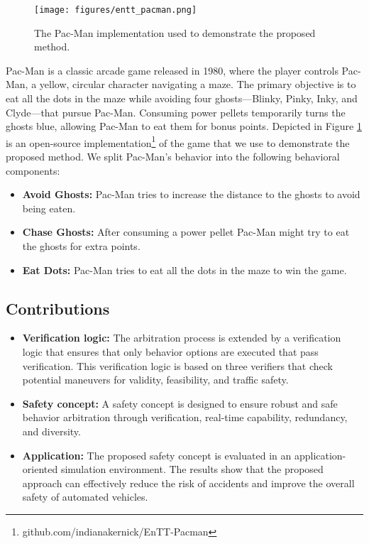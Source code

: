 \begin{figure}
    \centering
    \texttt{[image: figures/entt\_pacman.png]}
    \caption{The Pac-Man implementation used to demonstrate the proposed method.}
    \label{fig:entt-pacman}
\end{figure}
Pac-Man is a classic arcade game released in 1980, where the player controls Pac-Man, a yellow, circular character navigating a maze.
The primary objective is to eat all the dots in the maze while avoiding four ghosts—Blinky, Pinky, Inky, and Clyde—that pursue Pac-Man.
Consuming power pellets temporarily turns the ghosts blue, allowing Pac-Man to eat them for bonus points.
Depicted in Figure \ref{fig:entt-pacman} is an open-source implementation\footnote{github.com/indianakernick/EnTT-Pacman} of the game that we use to demonstrate the proposed method.
We split Pac-Man's behavior into the following behavioral components:

\begin{itemize}
    \item \textbf{Avoid Ghosts:} Pac-Man tries to increase the distance to the ghosts to avoid being eaten.
    \item \textbf{Chase Ghosts:} After consuming a power pellet Pac-Man might try to eat the ghosts for extra points.
    \item \textbf{Eat Dots:} Pac-Man tries to eat all the dots in the maze to win the game.
\end{itemize}

\subsection{Contributions}

\begin{itemize}
    \item \textbf{Verification logic:} The arbitration process is extended by a verification logic that ensures that only behavior options are executed that pass verification. This verification logic is based on three verifiers that check potential maneuvers for validity, feasibility, and traffic safety.
    \item \textbf{Safety concept:} A safety concept is designed to ensure robust and safe behavior arbitration through verification, real-time capability, redundancy, and diversity.
    \item \textbf{Application:} The proposed safety concept is evaluated in an application-oriented simulation environment. The results show that the proposed approach can effectively reduce the risk of accidents and improve the overall safety of automated vehicles.
\end{itemize}
